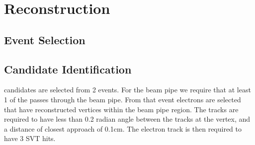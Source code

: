 \section{\deltaray Reconstruction}
\label{sec:reco}
\subsection{\eetomm Event Selection}
\subsection{\deltaray Candidate Identification}
	\deltaray candidates are selected from 2 \muon events. For the beam pipe we require that at least 1 of the \muons passes through the beam pipe. From that event electrons are selected that have reconstructed vertices within the beam pipe region. The tracks are required to have less than 0.2 radian angle between the tracks at the vertex, and a distance of closest approach of 0.1cm. The electron track is then required to have 3 SVT hits.